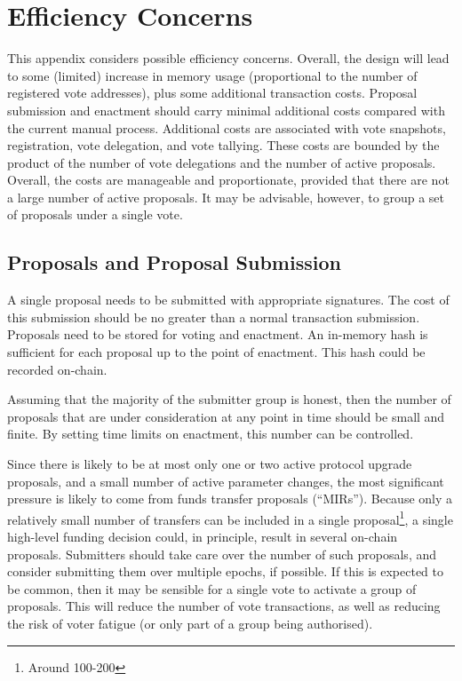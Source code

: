 \pagebreak
\section{Efficiency Concerns}
\label{sect:efficiency}

This appendix considers possible efficiency concerns.  Overall, the design will lead to some (limited) increase in memory
usage (proportional to the number of registered vote addresses), plus some additional transaction costs.
Proposal submission and enactment should carry minimal additional costs compared with the current manual process.
Additional costs are associated with vote snapshots, registration, vote delegation, and vote tallying.
These costs are bounded by the product of the number of vote delegations and the number of active proposals.
Overall, the costs are manageable and proportionate, provided that there are not a large number of active proposals.
It may be advisable, however, to group a set of proposals under a single vote.

\subsection{Proposals and Proposal Submission}

A single proposal needs to be submitted with appropriate signatures.  The cost of this submission should be no greater than
a normal transaction submission.  Proposals need to be stored for voting and enactment.  An in-memory hash is sufficient
for each proposal up to the point of enactment.  This hash could be recorded on-chain.

Assuming that the majority of the submitter group is honest, then the number of proposals that are under consideration
at any point in time should be small and finite.  By setting time limits on enactment, this number can be controlled.

Since there is likely to be at most only one or two active protocol upgrade proposals, and a small number of active parameter
changes, the most significant pressure is likely to come from funds transfer proposals (``MIRs'').  Because only a relatively
small number of transfers can be included in a single proposal\footnote{Around 100-200},
a single high-level funding decision could, in principle, result in several on-chain proposals.
Submitters should take care over the number of such proposals, and consider submitting them over multiple epochs, if possible.
If this is expected to be common, then it may be sensible for a single vote to activate a group of proposals.
This will reduce the number of vote transactions, as well as reducing the risk of voter fatigue (or only part of a group
being authorised).


